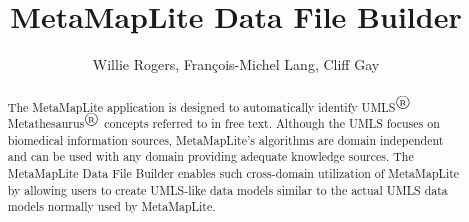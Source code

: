 \documentclass[letterpaper,article]{memoir}
\title{MetaMapLite Data File Builder}
\author{Willie Rogers, Fran\c{c}ois-Michel Lang, Cliff Gay}
\def\circleR{{\ooalign
   {\hfil\raise.07ex\hbox{\tiny R}\hfil\crcr\mathhexbox20D}}}
\begin{document}
\maketitle

\pagestyle{headings}

\begin{abstract}
  The MetaMapLite application is designed to automatically identify
  UMLS${}^{\circleR}$ Metathesaurus${}^{\circleR}$ concepts
  referred to in free text\cite{MetaMapLite:JAMIA}\cite{MetaMap:Overview}\cite{UMLS:MainPage}.
  Although the UMLS focuses on biomedical information sources,
  MetaMapLite's algorithms are domain independent and can be
  used with any domain providing adequate knowledge sources.
  The MetaMapLite Data File Builder enables such cross-domain
  utilization of MetaMapLite by allowing users to create
  UMLS-like data models similar to the actual UMLS data models
  normally used by MetaMapLite.
\end{abstract}
\end{document}
